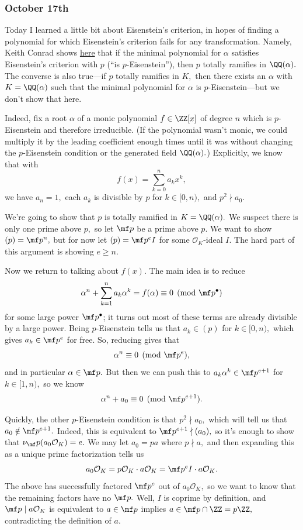 \subsubsection{October 17th}
Today I learned a little bit about Eisenstein's criterion, in hopes of finding a polynomial for which Eisenstein's criterion fails for any transformation. Namely, Keith Conrad shows \href{https://kconrad.math.uconn.edu/blurbs/gradnumthy/totram.pdf}{here} that if the minimal polynomial for $\alpha$ satisfies Eisenstein's criterion with $p$ (``is $p$-Eisenstein''), then $p$ totally ramifies in $\QQ(\alpha).$ The converse is also true---if $p$ totally ramifies in $K,$ then there exists an $\alpha$ with $K=\QQ(\alpha)$ such that the minimal polynomial for $\alpha$ is $p$-Eisenstein---but we don't show that here.

Indeed, fix a root $\alpha$ of a monic polynomial $f\in\ZZ[x]$ of degree $n$ which is $p$-Eisenstein and therefore irreducible. (If the polynomial wasn't monic, we could multiply it by the leading coefficient enough times until it was without changing the $p$-Eisenstein condition or the generated field $\QQ(\alpha).$) Explicitly, we know that with
\[f(x)=\sum_{k=0}^na_kx^k,\]
we have $a_n=1,$ each $a_k$ is divisible by $p$ for $k\in[0,n),$ and $p^2\nmid a_0.$

We're going to show that $p$ is totally ramified in $K=\QQ(\alpha).$ We suspect there is only one prime above $p,$ so let $\mf p$ be a prime above $p.$ We want to show $(p)=\mf p^n,$ but for now let $(p)=\mf p^eI$ for some $\mathcal O_K$-ideal $I.$ The hard part of this argument is showing $e\ge n.$

Now we return to talking about $f(x).$ The main idea is to reduce
\[\alpha^n+\sum_{k=1}^na_k\alpha^k=f(\alpha)\equiv0\pmod{\mf p^\bullet}\]
for some large power $\mf p^\bullet$; it turns out most of these terms are already divisible by a large power. Being $p$-Eisenstein tells us that $a_k\in(p)$ for $k\in[0,n),$ which gives $a_k\in\mf p^e$ for free. So, reducing gives that
\[\alpha^n\equiv0\pmod{\mf p^e},\]
and in particular $\alpha\in\mf p.$ But then we can push this to $a_k\alpha^k\in\mf p^{e+1}$ for $k\in[1,n),$ so we know
\[\alpha^n+a_0\equiv0\pmod{\mf p^{e+1}}.\]

Quickly, the other $p$-Eisenstein condition is that $p^2\nmid a_0,$ which will tell us that $a_0\notin\mf p^{e+1}.$ Indeed, this is equivalent to $\mf p^{e+1}\nmid(a_0),$ so it's enough to show that $\nu_\mf p(a_0\mathcal O_K)=e.$ We may let $a_0=pa$ where $p\nmid a,$ and then expanding this as a unique prime factorization tells us
\[a_0\mathcal O_K=p\mathcal O_K\cdot a\mathcal O_K=\mf p^eI\cdot a\mathcal O_K.\]
The above has successfully factored $\mf p^e$ out of $a_0\mathcal O_K,$ so we want to know that the remaining factors have no $\mf p.$ Well, $I$ is coprime by definition, and $\mf p\mid a\mathcal O_K$ is equivalent to $a\in\mf p$ implies $a\in\mf p\cap\ZZ=p\ZZ,$ contradicting the definition of $a.$

